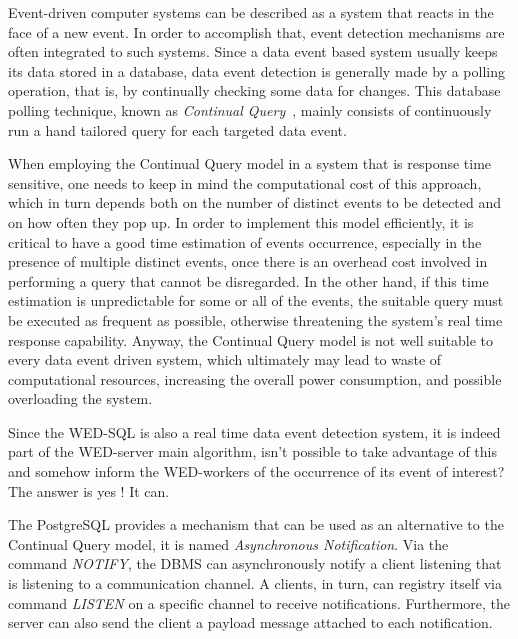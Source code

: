 \documentclass[12pt]{article}
\begin{document}
Event-driven computer systems can be described as a system that reacts in the face of a new event. In order to  accomplish that, event detection mechanisms are often integrated to such systems. Since a data event based system usually keeps its data stored in a database, data event detection is generally made by a polling operation, that is, by continually checking some data for changes. This database polling technique, known as \emph{Continual Query}~\cite{CQ}, mainly consists of  continuously run a hand tailored query for each targeted data event.     

\par When employing the Continual Query model in a system that is response time sensitive, one needs to keep in mind the computational cost of this approach, which in turn depends both on the number of distinct events to be detected and on how 
often they pop up. In order to implement this model efficiently, it is critical to have a good time estimation of events occurrence, especially in the presence of multiple distinct events, once there is an overhead cost involved in performing a query that cannot be disregarded. In the other hand, if this time estimation is unpredictable for some or all of the events, the suitable query must be executed as frequent as possible, otherwise threatening the system's real time response capability. Anyway, the Continual Query model is not well suitable to every data event driven system, which ultimately may lead to waste of computational resources, increasing the overall power consumption, and possible overloading the system.     
  
\par Since the WED-SQL is also a real time data event detection system, it is indeed part of the WED-server main algorithm, isn't possible to take advantage of this and somehow inform the WED-workers of the occurrence of its event of interest? The answer is yes ! It can.    

\par The PostgreSQL provides a mechanism that can be used as an alternative to the Continual Query model, it is named  \emph{Asynchronous Notification}. Via the command \emph{NOTIFY}, the DBMS can asynchronously notify a client listening that 
is listening to a communication channel. A clients, in turn, can registry itself via command \emph{LISTEN} on a specific  channel to receive notifications. Furthermore, the server can also send the client a payload message attached to each notification. 
\end{document}
